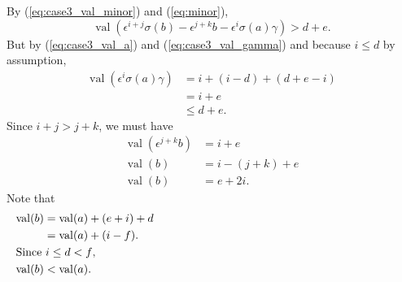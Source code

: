 \documentclass{amsart}
\theoremstyle{definition}
\def\e{\epsilon}
\def\val{\mathop{\mathrm{val}}}
\def\s{\sigma}
\begin{document}
  By (\ref{eq:case3_val_minor}) and (\ref{eq:minor}),
  \begin{equation}
    \label{eq:case3_expand_minor}
    \val(\e^{i+j}\s(b) - \e^{j+k}b - \e^i\s(a)\gamma) > d + e.
  \end{equation}
  But by (\ref{eq:case3_val_a}) and (\ref{eq:case3_val_gamma}) and because $i
  \le d$ by assumption,
  \begin{align*}
   \val(\e^i\s(a)\gamma) &= i + (i - d) + (d + e - i) \\
                         &= i + e \\
                         &\le d + e.
  \end{align*}
  Since $i + j > j + k$, we must have
  \begin{align}
    \val(\e^{j+k}b) &= i + e \nonumber \\
    \val(b) &= i - (j + k) + e \nonumber \\
    \label{eq:case3_val_b}
    \val(b) &= e + 2i.
  \end{align}
  Note that
  \begin{align}
    \val(b) &= \val(a) + (e + i) + d \nonumber \\
            &= \val(a) + (i - f). \nonumber \\
    \noalign{\noindent Since $i \le d < f$,}
    \label{eq:case3_b_less_a}
    \val(b) &< \val(a).
  \end{align}
\end{document}
